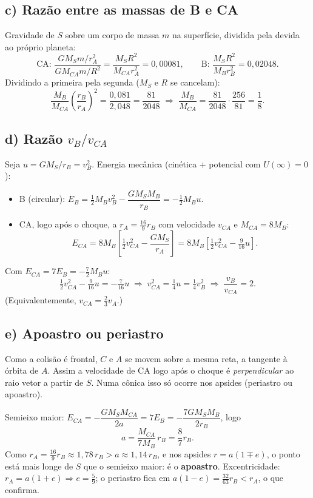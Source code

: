 \documentclass{article}%
\begin{document}
\subsection*{c) Razão entre as massas de B e CA}
Gravidade de $S$ sobre um corpo de massa $m$ na superfície, dividida pela devida ao próprio planeta:
\[
\text{CA: }\frac{GM_Sm/r_A^2}{GM_{CA}m/R^2}=\frac{M_SR^2}{M_{CA}r_A^2}=0{,}00081,\qquad
\text{B: }\frac{M_SR^2}{M_Br_B^2}=0{,}02048 .
\]
Dividindo a primeira pela segunda ($M_S$ e $R$ se cancelam):
\[
\frac{M_B}{M_{CA}}\left(\frac{r_B}{r_A}\right)^2=\frac{0{,}081}{2{,}048}=\frac{81}{2048}
\;\Rightarrow\;
\frac{M_B}{M_{CA}}=\frac{81}{2048}\cdot\frac{256}{81}=\frac{1}{8}.
\]

\subsection*{d) Razão $v_B/v_{CA}$}
Seja $u=GM_S/r_B=v_B^2$. Energia mecânica (cinética + potencial com $U(\infty)=0$):

\begin{itemize}
\item B (circular): $E_B=\tfrac12M_Bv_B^2-\dfrac{GM_SM_B}{r_B}=-\tfrac12M_Bu$.
\item CA, logo após o choque, a $r_A=\tfrac{16}{9}r_B$ com velocidade $v_{CA}$ e $M_{CA}=8M_B$:
\[
E_{CA}=8M_B\left[\tfrac12v_{CA}^2-\frac{GM_S}{r_A}\right]=8M_B\left[\tfrac12v_{CA}^2-\tfrac{9}{16}u\right].
\]
\end{itemize}
Com $E_{CA}=7E_B=-\tfrac72M_Bu$:
\[
\tfrac12v_{CA}^2-\tfrac{9}{16}u=-\tfrac{7}{16}u\;\Rightarrow\; v_{CA}^2=\tfrac14u=\tfrac14v_B^2
\;\Rightarrow\;\boxed{\frac{v_B}{v_{CA}}=2}.
\]
(Equivalentemente, $v_{CA}=\tfrac23v_A$.)

\subsection*{e) Apoastro ou periastro}
Como a colisão é frontal, $C$ e $A$ se movem sobre a mesma reta, a tangente à órbita de $A$. Assim a velocidade de CA logo após o choque é \emph{perpendicular} ao raio vetor a partir de $S$. Numa cônica isso só ocorre nos apsides (periastro ou apoastro).

Semieixo maior: $E_{CA}=-\dfrac{GM_SM_{CA}}{2a}=7E_B=-\dfrac{7GM_SM_B}{2r_B}$, logo
\[
a=\frac{M_{CA}}{7M_B}\,r_B=\frac{8}{7}r_B .
\]
Como $r_A=\tfrac{16}{9}r_B\approx1{,}78\,r_B>a\approx1{,}14\,r_B$, e nos apsides $r=a(1\mp e)$, o ponto está mais longe de $S$ que o semieixo maior: é o \textbf{apoastro}. Excentricidade: $r_A=a(1+e)\Rightarrow e=\tfrac59$; o periastro fica em $a(1-e)=\tfrac{32}{63}r_B<r_A$, o que confirma.
\end{document}
